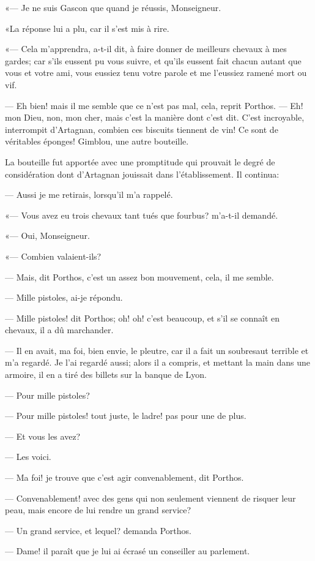 «— Je ne suis Gascon que quand je réussis, Monseigneur.

«La réponse lui a plu, car il s'est mis à rire.

«— Cela m'apprendra, a-t-il dit, à faire donner de meilleurs chevaux à mes gardes; car s'ils eussent pu vous suivre, et qu'ils eussent fait chacun autant que vous et votre ami, vous eussiez tenu votre parole et me l'eussiez ramené mort ou vif.

— Eh bien! mais il me semble que ce n'est pas mal, cela, reprit Porthos.
— Eh! mon Dieu, non, mon cher, mais c'est la manière dont c'est dit. C'est incroyable, interrompit d'Artagnan, combien ces biscuits tiennent de vin! Ce sont de véritables éponges! Gimblou, une autre bouteille.

La bouteille fut apportée avec une promptitude qui prouvait le degré de considération dont d'Artagnan jouissait dans l'établissement. Il continua:

— Aussi je me retirais, lorsqu'il m'a rappelé.

«— Vous avez eu trois chevaux tant tués que fourbus? m'a-t-il demandé.

«— Oui, Monseigneur.

«— Combien valaient-ils?

— Mais, dit Porthos, c'est un assez bon mouvement, cela, il me semble.

— Mille pistoles, ai-je répondu.

— Mille pistoles! dit Porthos; oh! oh! c'est beaucoup, et s'il se connaît en chevaux, il a dû marchander.

— Il en avait, ma foi, bien envie, le pleutre, car il a fait un soubresaut terrible et m'a regardé. Je l'ai regardé aussi; alors il a compris, et mettant la main dans une armoire, il en a tiré des billets sur la banque de Lyon.

— Pour mille pistoles?

— Pour mille pistoles! tout juste, le ladre! pas pour une de plus.

— Et vous les avez?

— Les voici.

— Ma foi! je trouve que c'est agir convenablement, dit Porthos.

— Convenablement! avec des gens qui non seulement viennent de risquer leur peau, mais encore de lui rendre un grand service?

— Un grand service, et lequel? demanda Porthos.

— Dame! il paraît que je lui ai écrasé un conseiller au parlement.

